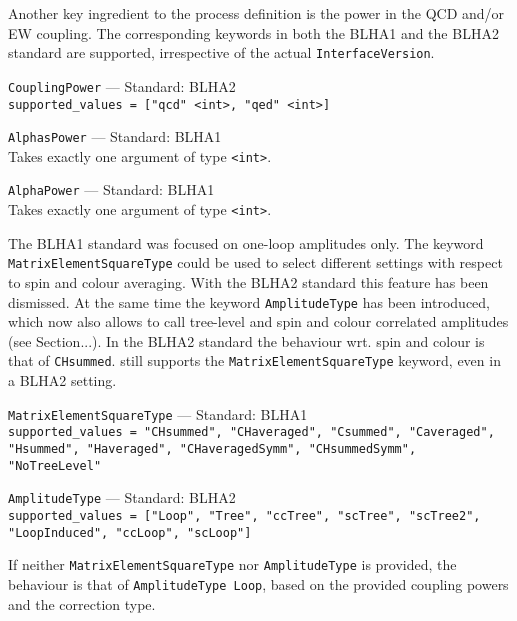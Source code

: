Another key ingredient to the process definition is the power in the QCD and/or EW coupling. The corresponding keywords in both the BLHA1 and the BLHA2 standard are supported, irrespective of the actual \texttt{InterfaceVersion}.
\begin{basedescript}{\desclabelstyle{\pushlabel}}
    \item[\hspace{-1em}]\colorbox{gray!30}{\lstinline[style=in]|CouplingPower|} --- Standard: BLHA2\vspace{0.1cm}\\
        \lstinline[style=in]|supported_values = ["qcd" <int>, "qed" <int>]|
     \item[\hspace{-1em}]\colorbox{gray!30}{\lstinline[style=in]|AlphasPower|} --- Standard: BLHA1\vspace{0.1cm}\\
        Takes exactly one argument of type \texttt{<int>}.
    \item[\hspace{-1em}]\colorbox{gray!30}{\lstinline[style=in]|AlphaPower|} --- Standard: BLHA1\vspace{0.1cm}\\
        Takes exactly one argument of type \texttt{<int>}.
\end{basedescript}

The BLHA1 standard was focused on one-loop amplitudes only. The keyword \texttt{MatrixElementSquareType} could be used to select different settings with respect to spin and colour averaging. With the BLHA2 standard this feature has been dismissed. At the same time the keyword \texttt{AmplitudeType} has been introduced, which now also allows to call tree-level and spin and colour correlated amplitudes (see Section...). In the BLHA2 standard the behaviour wrt. spin and colour is that of \texttt{CHsummed}. \gosam still supports the \texttt{MatrixElementSquareType} keyword, even in a BLHA2 setting.
\begin{basedescript}{\desclabelstyle{\pushlabel}}
    \item[\hspace{-1em}]\colorbox{gray!30}{\lstinline[style=in]|MatrixElementSquareType|} --- Standard: BLHA1\vspace{0.1cm}\\
        \lstinline[style=in]|supported_values = "CHsummed", "CHaveraged", "Csummed", "Caveraged", "Hsummed", "Haveraged", "CHaveragedSymm", "CHsummedSymm", "NoTreeLevel"|
    \item[\hspace{-1em}]\colorbox{gray!30}{\lstinline[style=in]|AmplitudeType|} --- Standard: BLHA2\vspace{0.1cm}\\
        \lstinline[style=in]|supported_values = ["Loop", "Tree", "ccTree", "scTree", "scTree2", "LoopInduced", "ccLoop", "scLoop"]|
\end{basedescript}
If neither \texttt{MatrixElementSquareType} nor \texttt{AmplitudeType} is provided, the behaviour is that of \lstinline[style=in]|AmplitudeType Loop|, based on the provided coupling powers and the correction type.\\

